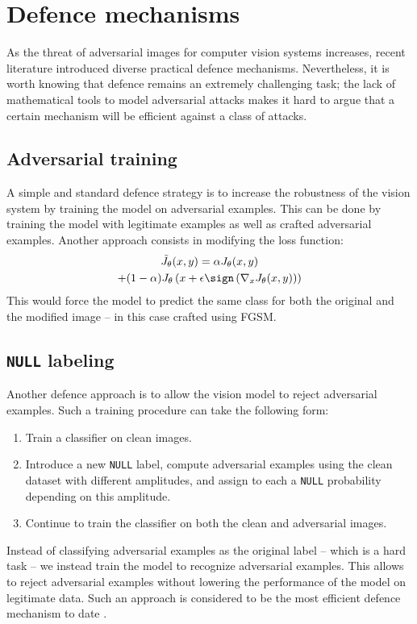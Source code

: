 \documentclass[twocolumn]{../cs-classes/cs-classes}
\begin{document}
\section{Defence mechanisms}
As the threat of adversarial images for computer vision systems increases, recent literature introduced diverse practical defence mechanisms. Nevertheless, it is worth knowing that defence remains an extremely challenging task; the lack of mathematical tools to model adversarial attacks makes it hard to argue that a certain mechanism will be efficient against a class of attacks.

\subsection{Adversarial training}
A simple and standard defence strategy is to increase the robustness of the vision system by training the model on adversarial examples. This can be done by training the model with legitimate examples as well as crafted adversarial examples. Another approach \cite{goodfellow2014explaining} consists in modifying the loss function:
\begin{multline*}
    \tilde{J}_\theta(x, y) = \alpha J_\theta(x, y) \\+ (1-\alpha)J_\theta\left(x+\epsilon\sign\left(\nabla_x J_\theta(x, y)\right)\right)
\end{multline*}
This would force the model to predict the same class for both the original and the modified image -- in this case crafted using FGSM.

\subsection{\texorpdfstring{\texttt{NULL}}{NULL} labeling}
Another defence approach is to allow the vision model to reject adversarial examples. Such a training procedure can take the following form:
\begin{enumerate}
    \item Train a classifier on clean images.
    \item Introduce a new \texttt{NULL} label, compute adversarial examples using the clean dataset with different amplitudes, and assign to each a \texttt{NULL} probability depending on this amplitude.
    \item Continue to train the classifier on both the clean and adversarial images.
\end{enumerate}
Instead of classifying adversarial examples as the original label -- which is a hard task -- we instead train the model to recognize adversarial examples. This allows to reject adversarial examples without lowering the performance of the model on legitimate data. Such an approach is considered to be the most efficient defence mechanism to date \cite{chakraborty2021survey}.
\end{document}
